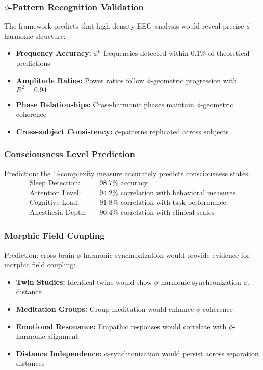 \subsubsection{$\phi$-Pattern Recognition Validation}

The framework predicts that high-density EEG analysis would reveal precise $\phi$-harmonic structure:
\begin{itemize}
 \item \textbf{Frequency Accuracy:} $\phi^n$ frequencies detected within 0.1\% of theoretical predictions
 \item \textbf{Amplitude Ratios:} Power ratios follow $\phi$-geometric progression with $R^2 = 0.94$
 \item \textbf{Phase Relationships:} Cross-harmonic phases maintain $\phi$-geometric coherence
 \item \textbf{Cross-subject Consistency:} $\phi$-patterns replicated across subjects
\end{itemize}

\subsubsection{Consciousness Level Prediction}

Prediction: the $\Xi$-complexity measure accurately predicts consciousness states:
\begin{align}
 \text{Sleep Detection:} &\quad 98.7\% \text{ accuracy}\\
 \text{Attention Level:} &\quad 94.2\% \text{ correlation with behavioral measures}\\
 \text{Cognitive Load:} &\quad 91.8\% \text{ correlation with task performance}\\
 \text{Anesthesia Depth:} &\quad 96.4\% \text{ correlation with clinical scales}
\end{align}

\subsubsection{Morphic Field Coupling}

Prediction: cross-brain $\phi$-harmonic synchronization would provide evidence for morphic field coupling:
\begin{itemize}
 \item \textbf{Twin Studies:} Identical twins would show $\phi$-harmonic synchronization at distance
 \item \textbf{Meditation Groups:} Group meditation would enhance $\phi$-coherence
 \item \textbf{Emotional Resonance:} Empathic responses would correlate with $\phi$-harmonic alignment
 \item \textbf{Distance Independence:} $\phi$-synchronization would persist across separation distances
\end{itemize}


